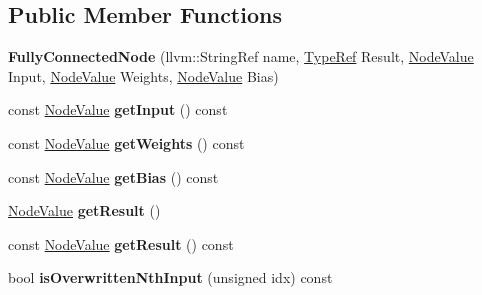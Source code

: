 \subsection*{Public Member Functions}
\begin{DoxyCompactItemize}
\item 
\mbox{\label{classglow_1_1_fully_connected_node_ac06fd81535f84893cc4aad5a00a78198}} 
{\bfseries Fully\+Connected\+Node} (llvm\+::\+String\+Ref name, \hyperlink{structglow_1_1_type}{Type\+Ref} Result, \hyperlink{structglow_1_1_node_value}{Node\+Value} Input, \hyperlink{structglow_1_1_node_value}{Node\+Value} Weights, \hyperlink{structglow_1_1_node_value}{Node\+Value} Bias)
\item 
\mbox{\label{classglow_1_1_fully_connected_node_ad3fd4813898816de0083413dbeb3ad1a}} 
const \hyperlink{structglow_1_1_node_value}{Node\+Value} {\bfseries get\+Input} () const
\item 
\mbox{\label{classglow_1_1_fully_connected_node_a81be0d43e9e5bdeb5c770418cbc5af5e}} 
const \hyperlink{structglow_1_1_node_value}{Node\+Value} {\bfseries get\+Weights} () const
\item 
\mbox{\label{classglow_1_1_fully_connected_node_ab612d6270b4a746cb1f1f98a7226c28f}} 
const \hyperlink{structglow_1_1_node_value}{Node\+Value} {\bfseries get\+Bias} () const
\item 
\mbox{\label{classglow_1_1_fully_connected_node_a53bdcb854c5fdff67ab67eed1b22a78a}} 
\hyperlink{structglow_1_1_node_value}{Node\+Value} {\bfseries get\+Result} ()
\item 
\mbox{\label{classglow_1_1_fully_connected_node_ae9d35d384e5f33687838592523b354ef}} 
const \hyperlink{structglow_1_1_node_value}{Node\+Value} {\bfseries get\+Result} () const
\item 
\mbox{\label{classglow_1_1_fully_connected_node_a789cc5951568c56bbade5d315a356b76}} 
bool {\bfseries is\+Overwritten\+Nth\+Input} (unsigned idx) const
\item 

\end{DoxyCompactItemize}
